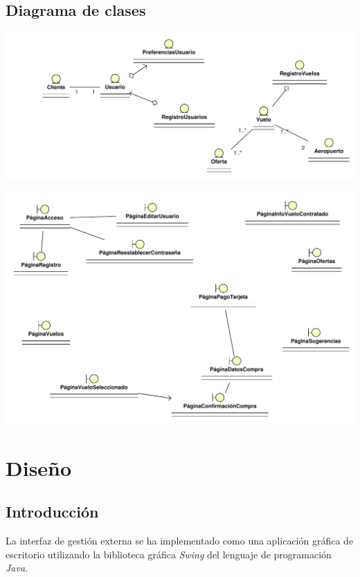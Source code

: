\documentclass[11pt, a4paper, twoside, titlepage]{article}
\begin{document}
\begin{landscape}
		\subsection{Diagrama de clases}
			\begin{center}
				\vspace{2cm}
				\hspace{-2cm}
				\includegraphics[scale=1]{analisis/diagramas/diagramaclases.pdf}
			\end{center}	
\end{landscape}
\begin{landscape}
			\begin{center}
				\includegraphics[scale=1]{analisis/diagramas/sitioweb.pdf}
			\end{center}
\end{landscape}
	\newpage

	\section{Diseño}
		\subsection{Introducción}
			La interfaz de gestión externa se ha implementado como una aplicación gráfica de escritorio utilizando la biblioteca gráfica {\itshape Swing} del lenguaje de programación {\itshape Java}.
\end{document}
